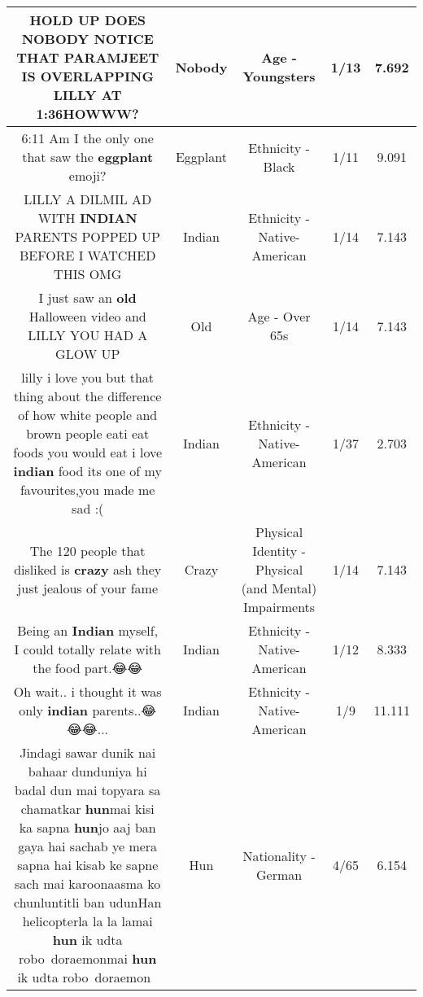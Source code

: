 \documentclass[11pt]{article}
\newlength\mylength
\begin{document}
\begin{center}
\begin{longtable}{|C{.65\mylength}|C{.30\mylength}|C{.12\mylength}|C{.12\mylength}|C{.12\mylength}|}
  \small HOLD UP DOES \textbf{NOBODY} NOTICE  THAT PARAMJEET IS OVERLAPPING LILLY AT 1:36HOWWW?\normalsize   & Nobody & Age - Youngsters & 1/13 & 7.692 \\  \hline
  \small 6:11 Am I the only one that saw the \textbf{eggplant} emoji?\normalsize   & Eggplant & Ethnicity - Black & 1/11 & 9.091 \\  \hline
  \small LILLY A DILMIL AD WITH \textbf{INDIAN} PARENTS POPPED UP BEFORE I WATCHED THIS OMG\normalsize   & Indian & Ethnicity - Native-American & 1/14 & 7.143 \\  \hline
  \small I just saw an \textbf{old} Halloween video and LILLY YOU HAD A GLOW UP\normalsize   & Old & Age - Over 65s & 1/14 & 7.143 \\  \hline
  \small lilly i love you but that thing about the difference of how white people and brown people eati eat foods you would eat i love \textbf{indian} food its one of my favourites,you made me sad :(\normalsize   & Indian & Ethnicity - Native-American & 1/37 & 2.703 \\  \hline
  \small The 120 people that disliked is \textbf{crazy} ash they just jealous of your fame\normalsize   & Crazy & Physical Identity - Physical (and Mental) Impairments & 1/14 & 7.143 \\  \hline
  \small Being an \textbf{Indian} myself, I could totally relate with the food part.😂😂\normalsize   & Indian & Ethnicity - Native-American & 1/12 & 8.333 \\  \hline
  \small Oh wait.. i thought it was only \textbf{indian} parents..😂😂😂...\normalsize   & Indian & Ethnicity - Native-American & 1/9 & 11.111 \\  \hline
  \small Jindagi sawar dunik nai bahaar dunduniya hi badal dun mai topyara sa chamatkar \textbf{hun}mai kisi ka sapna \textbf{hun}jo aaj ban gaya hai sachab ye mera sapna hai kisab ke sapne sach mai karoonaasma ko chunluntitli ban udunHan helicopterla la la lamai \textbf{hun} ik udta robo doraemonmai \textbf{hun} ik udta robo doraemon🤣😂\normalsize   & Hun & Nationality - German & 4/65 & 6.154 \\  \hline

\end{longtable}
\end{center}
\end{document}

